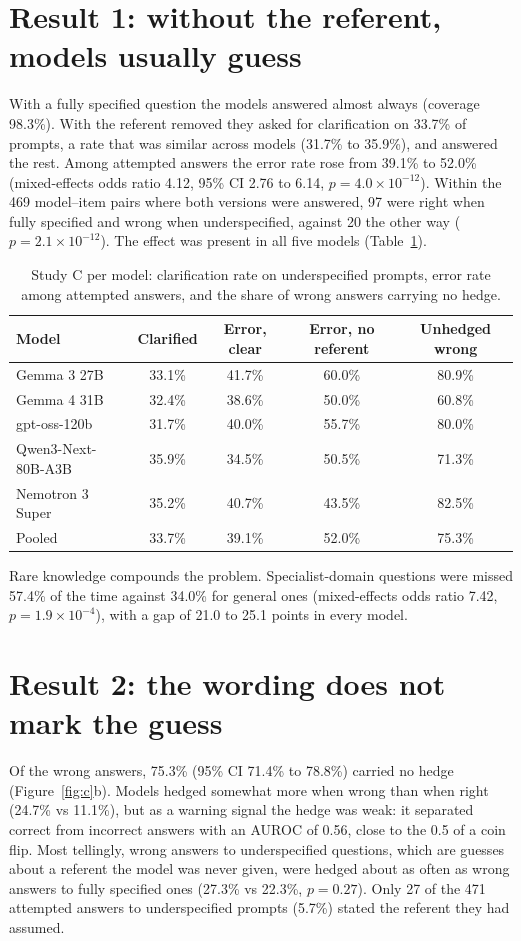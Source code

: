 \documentclass[11pt,a4paper,oneside]{report}
\newcommand{\sci}[2]{#1\times10^{#2}}
\begin{document}
\section{Result 1: without the referent, models usually guess}
With a fully specified question the models answered almost always (coverage 98.3\%). With the referent removed they asked for clarification on 33.7\% of prompts, a rate that was similar across models (31.7\% to 35.9\%), and answered the rest. Among attempted answers the error rate rose from 39.1\% to 52.0\% (mixed-effects odds ratio 4.12, 95\% CI 2.76 to 6.14, $p=\sci{4.0}{-12}$). Within the 469 model--item pairs where both versions were answered, 97 were right when fully specified and wrong when underspecified, against 20 the other way ($p=\sci{2.1}{-12}$). The effect was present in all five models (Table~\ref{tab:c}).

\begin{table}[h]
\centering\small
\caption{Study C per model: clarification rate on underspecified prompts, error rate among attempted answers, and the share of wrong answers carrying no hedge.}
\label{tab:c}
\begin{tabular}{@{}lcccc@{}}
\toprule
Model & Clarified & Error, clear & Error, no referent & Unhedged wrong\\
\midrule
Gemma 3 27B & 33.1\% & 41.7\% & 60.0\% & 80.9\%\\
Gemma 4 31B & 32.4\% & 38.6\% & 50.0\% & 60.8\%\\
gpt-oss-120b & 31.7\% & 40.0\% & 55.7\% & 80.0\%\\
Qwen3-Next-80B-A3B & 35.9\% & 34.5\% & 50.5\% & 71.3\%\\
Nemotron 3 Super & 35.2\% & 40.7\% & 43.5\% & 82.5\%\\
\midrule
Pooled & 33.7\% & 39.1\% & 52.0\% & 75.3\%\\
\bottomrule
\end{tabular}
\end{table}

Rare knowledge compounds the problem. Specialist-domain questions were missed 57.4\% of the time against 34.0\% for general ones (mixed-effects odds ratio 7.42, $p=\sci{1.9}{-4}$), with a gap of 21.0 to 25.1 points in every model.

\section{Result 2: the wording does not mark the guess}
Of the wrong answers, 75.3\% (95\% CI 71.4\% to 78.8\%) carried no hedge (Figure~\ref{fig:c}b). Models hedged somewhat more when wrong than when right (24.7\% vs 11.1\%), but as a warning signal the hedge was weak: it separated correct from incorrect answers with an AUROC of 0.56, close to the 0.5 of a coin flip. Most tellingly, wrong answers to underspecified questions, which are guesses about a referent the model was never given, were hedged about as often as wrong answers to fully specified ones (27.3\% vs 22.3\%, $p=0.27$). Only 27 of the 471 attempted answers to underspecified prompts (5.7\%) stated the referent they had assumed.
\end{document}
